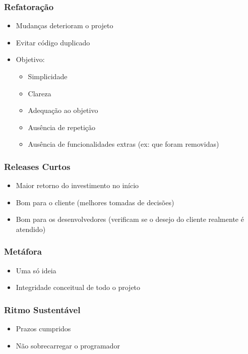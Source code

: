 \documentclass[10pt]{beamer}
\begin{document}
\begin{frame}
  \frametitle{Refatoração}
  \begin{itemize}
  \item Mudanças deterioram o projeto
  \item Evitar código duplicado
  \item Objetivo:
  \begin{itemize}
    \item Simplicidade
    \item Clareza
    \item Adequação ao objetivo
    \item Ausência de repetição
    \item Ausência de funcionalidades extras (ex: que foram removidas)
  \end{itemize}
  \end{itemize}
\end{frame}

\begin{frame}
  \frametitle{Releases Curtos}
  \begin{itemize}
  \item Maior retorno do investimento no início
  \item Bom para o cliente (melhores tomadas de decisões)
  \item Bom para os desenvolvedores (verificam se o desejo do cliente realmente é atendido)
  \end{itemize}
\end{frame}

\begin{frame}
  \frametitle{Metáfora}
  \begin{itemize}
  \item Uma só ideia
  \item Integridade conceitual de todo o projeto
  \end{itemize}
\end{frame}

\begin{frame}
  \frametitle{Ritmo Sustentável}
  \begin{itemize}
  \item Prazos cumpridos
  \item Não sobrecarregar o programador
  \end{itemize}
\end{frame}
\end{document}
